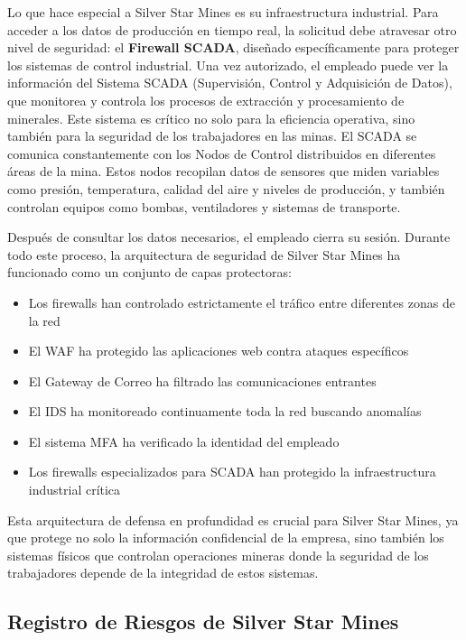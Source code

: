 Lo que hace especial a Silver Star Mines es su infraestructura industrial. Para acceder a los datos de producción en tiempo real, la solicitud debe atravesar otro nivel de seguridad: el \textbf{Firewall SCADA}, diseñado específicamente para proteger los sistemas de control industrial.
Una vez autorizado, el empleado puede ver la información del Sistema SCADA (Supervisión, Control y Adquisición de Datos), que monitorea y controla los procesos de extracción y procesamiento de minerales. Este sistema es crítico no solo para la eficiencia operativa, sino también para la seguridad de los trabajadores en las minas.
El SCADA se comunica constantemente con los Nodos de Control distribuidos en diferentes áreas de la mina. Estos nodos recopilan datos de sensores que miden variables como presión, temperatura, calidad del aire y niveles de producción, y también controlan equipos como bombas, ventiladores y sistemas de transporte.


Después de consultar los datos necesarios, el empleado cierra su sesión. Durante todo este proceso, la arquitectura de seguridad de Silver Star Mines ha funcionado como un conjunto de capas protectoras:

\begin{itemize}
    \item Los firewalls han controlado estrictamente el tráfico entre diferentes zonas de la red
    \item El WAF ha protegido las aplicaciones web contra ataques específicos
    \item El Gateway de Correo ha filtrado las comunicaciones entrantes
    \item El IDS ha monitoreado continuamente toda la red buscando anomalías
    \item El sistema MFA ha verificado la identidad del empleado
    \item Los firewalls especializados para SCADA han protegido la infraestructura industrial crítica

\end{itemize}


Esta arquitectura de defensa en profundidad es crucial para Silver Star Mines, ya que protege no solo la información confidencial de la empresa, sino también los sistemas físicos que controlan operaciones mineras donde la seguridad de los trabajadores depende de la integridad de estos sistemas.




\subsection{Registro de Riesgos de Silver Star Mines}





